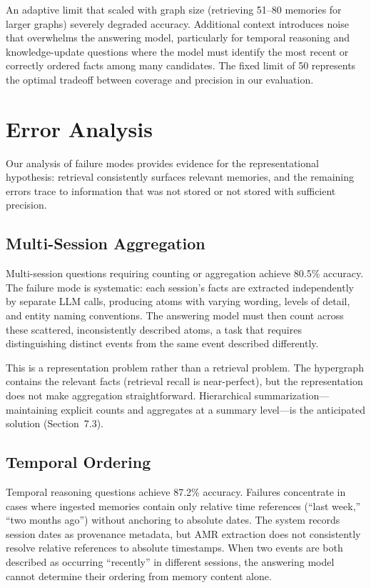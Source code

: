 \documentclass[11pt,a4paper]{article}
\begin{document}
An adaptive limit that scaled with graph size (retrieving 51--80 memories for larger graphs) severely degraded accuracy. Additional context introduces noise that overwhelms the answering model, particularly for temporal reasoning and knowledge-update questions where the model must identify the most recent or correctly ordered facts among many candidates. The fixed limit of 50 represents the optimal tradeoff between coverage and precision in our evaluation.

\section{Error Analysis}

Our analysis of failure modes provides evidence for the representational hypothesis: retrieval consistently surfaces relevant memories, and the remaining errors trace to information that was not stored or not stored with sufficient precision.

\subsection{Multi-Session Aggregation}

Multi-session questions requiring counting or aggregation achieve 80.5\% accuracy. The failure mode is systematic: each session's facts are extracted independently by separate LLM calls, producing atoms with varying wording, levels of detail, and entity naming conventions. The answering model must then count across these scattered, inconsistently described atoms, a task that requires distinguishing distinct events from the same event described differently.

This is a representation problem rather than a retrieval problem. The hypergraph contains the relevant facts (retrieval recall is near-perfect), but the representation does not make aggregation straightforward. Hierarchical summarization---maintaining explicit counts and aggregates at a summary level---is the anticipated solution (Section~7.3).

\subsection{Temporal Ordering}

Temporal reasoning questions achieve 87.2\% accuracy. Failures concentrate in cases where ingested memories contain only relative time references (``last week,'' ``two months ago'') without anchoring to absolute dates. The system records session dates as provenance metadata, but AMR extraction does not consistently resolve relative references to absolute timestamps. When two events are both described as occurring ``recently'' in different sessions, the answering model cannot determine their ordering from memory content alone.
\end{document}
